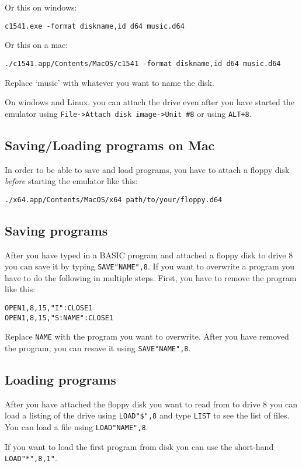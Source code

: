 \documentclass{article}
\begin{document}
Or this on windows:

\begin{lstlisting}
c1541.exe -format diskname,id d64 music.d64
\end{lstlisting}

Or this on a mac:

\begin{lstlisting}
./c1541.app/Contents/MacOS/c1541 -format diskname,id d64 music.d64
\end{lstlisting}

Replace `music' with whatever you want to name the disk.

On windows and Linux, you can attach the drive even after you have started the emulator using \verb:File->Attach disk image->Unit #8: or using \verb:ALT+8:.

\subsection{Saving/Loading programs on Mac}

In order to be able to save and load programs, you have to attach a floppy disk \emph{before} starting the emulator like this:

\begin{lstlisting}
./x64.app/Contents/MacOS/x64 path/to/your/floppy.d64
\end{lstlisting}

\subsection{Saving programs}

After you have typed in a BASIC program and attached a floppy disk to drive 8 you can save it by typing \verb:SAVE"NAME",8:.
If you want to overwrite a program you have to do the following in multiple steps.
First, you have to remove the program like this:

\begin{lstlisting}
OPEN1,8,15,"I":CLOSE1
OPEN1,8,15,"S:NAME":CLOSE1
\end{lstlisting}

Replace \verb:NAME: with the program you want to overwrite.
After you have removed the program, you can resave it using \verb:SAVE"NAME",8:.

\subsection{Loading programs}

After you have attached the floppy disk you want to read from to drive 8 you can load a listing of the drive using \verb:LOAD"$",8: and type \verb:LIST: to see the list of files.
You can load a file using \verb:LOAD"NAME",8:.

If you want to load the first program from disk you can use the short-hand \verb:LOAD"*",8,1":.
\end{document}
